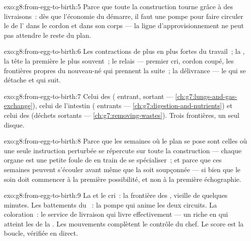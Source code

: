 \begin{solution}{exo:g8:from-egg-to-birth:5}
Parce que toute la construction tourne grâce à des livraisons~: dès
que l'économie du  démarre, il faut une pompe pour faire
circuler le  de l' dans le cordon et dans son corps ---
la ligne d'approvisionnement ne peut pas attendre le reste du plan.
\end{solution}

\begin{solution}{exo:g8:from-egg-to-birth:6}
Les contractions de plus en plus fortes du travail~; la ,
la tête la première le plus souvent~; le relais --- premier cri,
cordon coupé, les frontières propres du nouveau-né qui prennent la
suite~; la délivrance --- le  qui se détache et qui suit.
\end{solution}

\begin{solution}{exo:g8:from-egg-to-birth:7}
Celui des  ( entrant,  sortant ---
\cref{ch:g7:lungs-and-gas-exchange}), celui de l'intestin
( entrants --- \cref{ch:g7:digestion-and-nutrients}) et
celui des  (déchets sortants ---
\cref{ch:g7:removing-wastes}). Trois frontières, un seul disque.
\end{solution}

\begin{solution}{exo:g8:from-egg-to-birth:8}
Parce que les semaines où le plan se pose sont celles où une seule
instruction perturbée se répercute sur toute la construction ---
chaque organe est une petite foule de  en train de se
spécialiser~; et parce que ces semaines peuvent s'écouler avant même
que la  soit soupçonnée --- si bien que le soin doit
commencer à la première possibilité, et non à la première
échographie.
\end{solution}

\begin{solution}{exo:g8:from-egg-to-birth:9}
La  et le cri~: la frontière des , vieille de
quelques minutes. Les battements du ~: la pompe qui anime les
deux circuits. La coloration~: le service de livraison qui livre
effectivement --- un  riche en  qui atteint les
 de la . Les mouvements complètent le contrôle du
chef. Le score est la boucle, vérifiée en direct.
\end{solution}

